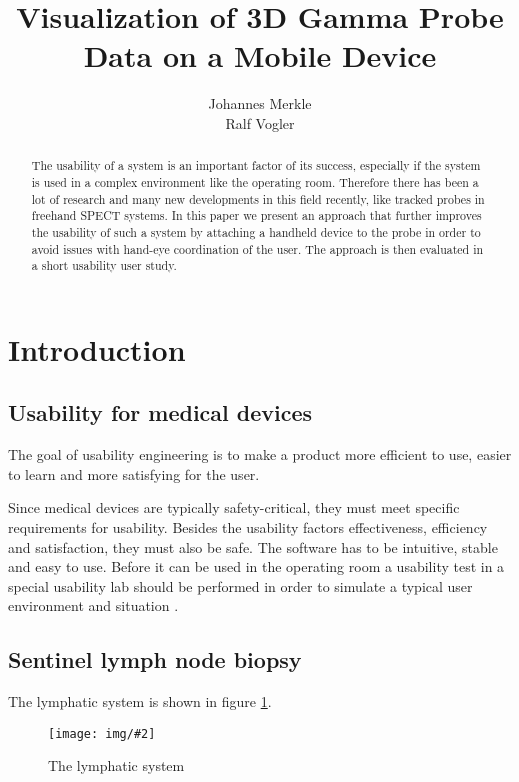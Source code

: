 \documentclass{scrartcl}
\title{Visualization of 3D Gamma Probe Data on a Mobile Device}
\author{Johannes Merkle \\ Ralf Vogler}
\newcommand{\red}[1]{{\color{red} #1}}
\newcommand{\graphic}[3][width=\linewidth] %
{
  \begin{figure}[h!t]
    \centering
    \texttt{[image: img/\#2]}
    \caption{#3}
    \label{fig:#2}
  \end{figure}
}
\newcommand{\refFigure}[1]{figure \ref{fig:#1}}
\begin{document}
\maketitle


\begin{abstract}
The usability of a system is an important factor of its success, especially if the system is used in a complex environment like the operating room. Therefore there has been a lot of research and many new developments in this field recently, like tracked probes in freehand SPECT systems. In this paper we present an approach that further improves the usability of such a system by attaching a handheld device to the probe in order to avoid issues with hand-eye coordination of the user. The approach is then evaluated in a short usability user study.
\end{abstract}



\section{Introduction}


\subsection{Usability for medical devices}
The goal of usability engineering is to make a product more efficient to use, easier to learn and more satisfying for the user.

Since medical devices are typically safety-critical, they must meet specific requirements for usability. Besides the usability factors effectiveness, efficiency and satisfaction, they must also be safe. The software has to be intuitive, stable and easy to use. Before it can be used in the operating room a usability test in a special usability lab should be performed in order to simulate a typical user environment and situation \cite{bigdelou}.


\subsection{Sentinel lymph node biopsy}
The lymphatic system is shown in \refFigure{lymphatic-system}.
\graphic[scale=.7]{lymphatic-system}{The lymphatic system}
\end{document}
